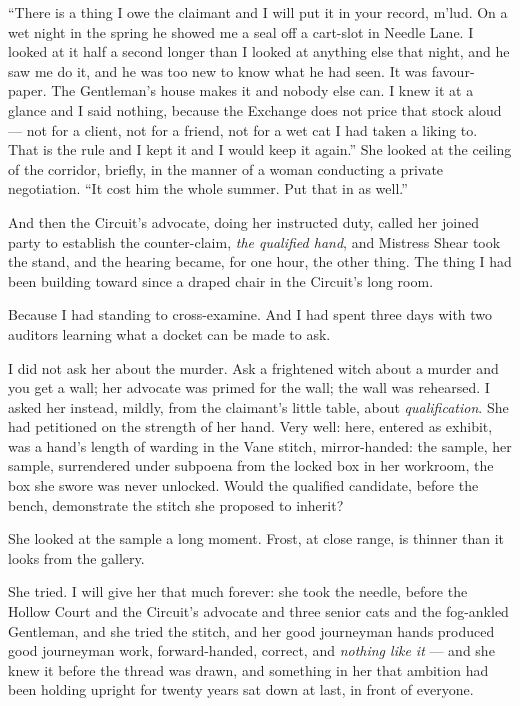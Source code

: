 ``There is a thing I owe the claimant and I will put it in your record, m'lud. On a wet night in the spring he showed me a seal off a cart-slot in Needle Lane. I looked at it half a second longer than I looked at anything else that night, and he saw me do it, and he was too new to know what he had seen. It was favour-paper. The Gentleman's house makes it and nobody else can. I knew it at a glance and I said nothing, because the Exchange does not price that stock aloud --- not for a client, not for a friend, not for a wet cat I had taken a liking to. That is the rule and I kept it and I would keep it again.'' She looked at the ceiling of the corridor, briefly, in the manner of a woman conducting a private negotiation. ``It cost him the whole summer. Put that in as well.''

And then the Circuit's advocate, doing her instructed duty, called her joined party to establish the counter-claim, \emph{the qualified hand}, and Mistress Shear took the stand, and the hearing became, for one hour, the other thing. The thing I had been building toward since a draped chair in the Circuit's long room.

Because I had standing to cross-examine. And I had spent three days with two auditors learning what a docket can be made to ask.

I did not ask her about the murder. Ask a frightened witch about a murder and you get a wall; her advocate was primed for the wall; the wall was rehearsed. I asked her instead, mildly, from the claimant's little table, about \emph{qualification}. She had petitioned on the strength of her hand. Very well: here, entered as exhibit, was a hand's length of warding in the Vane stitch, mirror-handed: the sample, her sample, surrendered under subpoena from the locked box in her workroom, the box she swore was never unlocked. Would the qualified candidate, before the bench, demonstrate the stitch she proposed to inherit?

She looked at the sample a long moment. Frost, at close range, is thinner than it looks from the gallery.

She tried. I will give her that much forever: she took the needle, before the Hollow Court and the Circuit's advocate and three senior cats and the fog-ankled Gentleman, and she tried the stitch, and her good journeyman hands produced good journeyman work, forward-handed, correct, and \emph{nothing like it} --- and she knew it before the thread was drawn, and something in her that ambition had been holding upright for twenty years sat down at last, in front of everyone.

